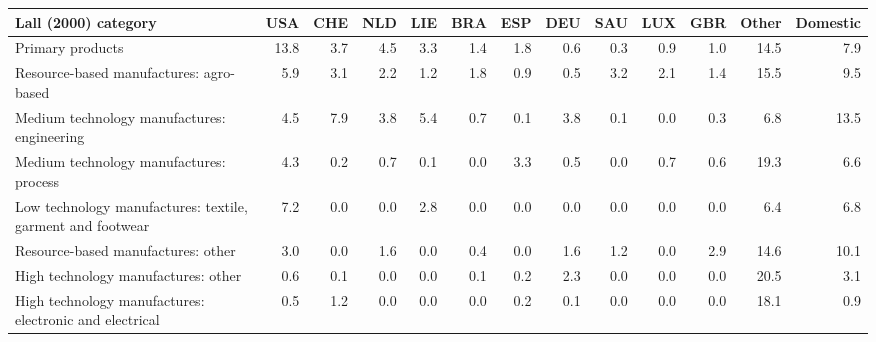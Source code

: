 \begin{tabular}{lrrrrrrrrrrrr}
\toprule
Lall (2000) category & USA & CHE & NLD & LIE & BRA & ESP & DEU & SAU & LUX & GBR & Other & Domestic \\
\midrule
Primary products & 13.8 & 3.7 & 4.5 & 3.3 & 1.4 & 1.8 & 0.6 & 0.3 & 0.9 & 1.0 & 14.5 & 7.9 \\
Resource-based manufactures: agro-based & 5.9 & 3.1 & 2.2 & 1.2 & 1.8 & 0.9 & 0.5 & 3.2 & 2.1 & 1.4 & 15.5 & 9.5 \\
Medium technology manufactures: engineering & 4.5 & 7.9 & 3.8 & 5.4 & 0.7 & 0.1 & 3.8 & 0.1 & 0.0 & 0.3 & 6.8 & 13.5 \\
Medium technology manufactures: process & 4.3 & 0.2 & 0.7 & 0.1 & 0.0 & 3.3 & 0.5 & 0.0 & 0.7 & 0.6 & 19.3 & 6.6 \\
Low technology manufactures: textile, garment and footwear & 7.2 & 0.0 & 0.0 & 2.8 & 0.0 & 0.0 & 0.0 & 0.0 & 0.0 & 0.0 & 6.4 & 6.8 \\
Resource-based manufactures: other & 3.0 & 0.0 & 1.6 & 0.0 & 0.4 & 0.0 & 1.6 & 1.2 & 0.0 & 2.9 & 14.6 & 10.1 \\
High technology manufactures: other & 0.6 & 0.1 & 0.0 & 0.0 & 0.1 & 0.2 & 2.3 & 0.0 & 0.0 & 0.0 & 20.5 & 3.1 \\
High technology manufactures: electronic and electrical & 0.5 & 1.2 & 0.0 & 0.0 & 0.0 & 0.2 & 0.1 & 0.0 & 0.0 & 0.0 & 18.1 & 0.9 \\
\bottomrule
\end{tabular}
